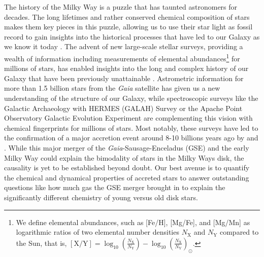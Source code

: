 \documentclass[fleqn,usenatbib]{mnras}
\newcommand{\Gaia}{\textit{Gaia}\xspace} %
\begin{document}
The history of the Milky Way is a puzzle that has taunted astronomers for decades. The long lifetimes and rather conserved chemical composition of stars makes them key pieces in this puzzle, allowing us to use their star light as fossil record to gain insights into the historical processes that have led to our Galaxy as we know it today \citep{FreemanBlandHawthorn2002}. The advent of new large-scale stellar surveys, providing a wealth of information including measurements of elemental abundances\footnote{We define elemental abundances, such as [Fe/H], [Mg/Fe], and [Mg/Mn] as logarithmic ratios of two elemental number densities $N_\text{X}$ and $N_\text{Y}$ compared to the Sun, that is, $\left[\text{X/Y}\right]=\log_{10}\left(\frac{N_\text{X}}{N_\text{Y}}\right) -\log_{10}\left(\frac{N_\text{X}}{N_\text{Y}}\right)_\odot$.} for millions of stars, has enabled insights into the long and complex history of our Galaxy that have been previously unattainable \citep{Jofre2019}. Astrometric information for more than 1.5 billion stars from the \Gaia satellite \citep{Brown2016,Brown2018,Brown2021} has given us a new understanding of the structure of our Galaxy, while spectroscopic surveys like the Galactic Archaeology with HERMES (GALAH) Survey \citep{daSilva2015} or the Apache Point Observatory Galactic Evolution Experiment \citep[APOGEE,][]{Majewski2016} are complementing this vision with chemical fingerprints for millions of stars. Most notably, these surveys have led to the confirmation of a major accretion event around 8-10 billions years ago by \citet{Belokurov2018} and \citet{Helmi2018}. While this major merger of the \Gaia-Sausage-Enceladus (GSE) and the early Milky Way could explain the bimodality of stars in the Milky Ways disk, the causality is yet to be established beyond doubt. Our best avenue is to quantify the chemical and dynamical properties of accreted stars to answer outstanding questions like how much gas the GSE merger brought in to explain the significantly different chemistry of young versus old disk stars.
\end{document}
